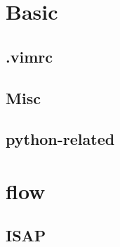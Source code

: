 \documentclass[a4paper,10pt,twocolumn,oneside]{article}
\begin{document}
\pagestyle{fancy}
\fancyfoot{}
\fancyhead[R]{\thepage}
\renewcommand{\headrulewidth}{0.4pt}
\renewcommand{\contentsname}{Contents} 

\scriptsize
\tableofcontents

\newpage

\section{Basic}
\subsection{.vimrc}


%

%

\subsection{Misc}


\subsection{python-related}


\section{flow}

\subsection{ISAP}


%
\end{document}
